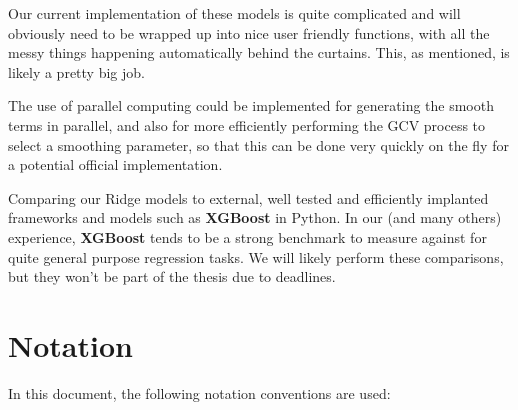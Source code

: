 \documentclass[12pt, twoside,hidelinks]{article}
\theoremstyle{definition}
\numberwithin{equation}{section}
\begin{document}
Our current implementation of these models is quite complicated and will obviously need to be wrapped up into nice user friendly functions, with all the messy things happening automatically behind the curtains. This, as mentioned, is likely a pretty big job. 
\newline

The use of parallel computing could be implemented for generating the smooth terms in parallel, and also for more efficiently performing the GCV process to select a smoothing parameter, so that this can be done very quickly on the fly for a potential official implementation.
\newline

Comparing our Ridge models to external, well tested and efficiently implanted frameworks and models such as \textbf{XGBoost} in Python. In our (and many others) experience, \textbf{XGBoost} tends to be a strong benchmark to measure against for quite general purpose regression tasks. We will likely perform these comparisons, but they won't be part of the thesis due to deadlines.  

\newpage

\listoffigures


\FloatBarrier %

\appendix

\section{Notation}\label{app:notation}

In this document, the following notation conventions are used:
\end{document}
